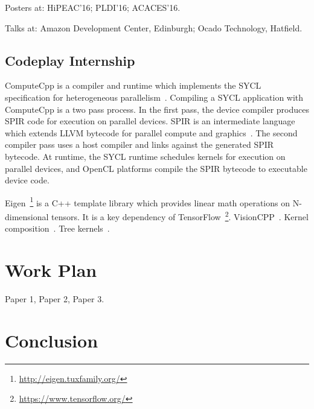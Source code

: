 Posters at: HiPEAC'16; PLDI'16; ACACES'16.

Talks at: Amazon Development Center, Edinburgh; Ocado Technology,
Hatfield.


\subsection{Codeplay Internship}

ComputeCpp is a compiler and runtime which implements the SYCL
specification for heterogeneous
parallelism~\cite{Rovatsou2015}. Compiling a SYCL application with
ComputeCpp is a two pass process. In the first pass, the device
compiler produces SPIR code for execution on parallel devices. SPIR is
an intermediate language which extends LLVM bytecode for parallel
compute and graphics~\cite{Portable2014}. The second compiler pass
uses a host compiler and links against the generated SPIR bytecode. At
runtime, the SYCL runtime schedules kernels for execution on parallel
devices, and OpenCL platforms compile the SPIR bytecode to executable
device code.

Eigen~\footnote{\url{http://eigen.tuxfamily.org/}} is a C++ template
library which provides linear math operations on N-dimensional
tensors. It is a key dependency of
TensorFlow~\footnote{\url{https://www.tensorflow.org/}}. VisionCPP~\cite{Goli2016a}. Kernel
composition~\cite{Potter2015}. Tree kernels~\cite{Annesi2014}.

\section{Work Plan}

Paper 1, Paper 2, Paper 3.


\section{Conclusion}


\newpage
\label{bibliography}
\printbibliography



